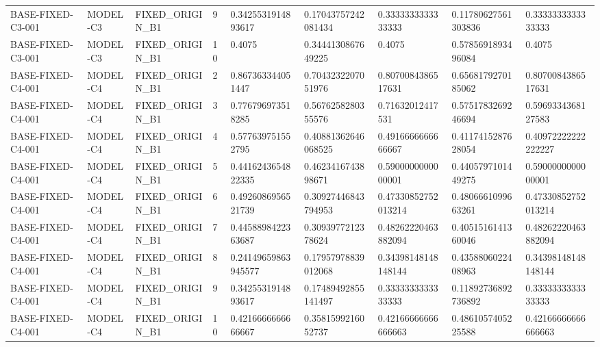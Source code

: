 \begin{tabular}{lllllllll}
BASE-FIXED-C3-001 & MODEL-C3 & FIXED\_ORIGIN\_B1 & 9 & 0.3425531914893617 & 0.17043757242081434 & 0.3333333333333333 & 0.11780627561303836 & 0.3333333333333333 \\
BASE-FIXED-C3-001 & MODEL-C3 & FIXED\_ORIGIN\_B1 & 10 & 0.4075 & 0.3444130867649225 & 0.4075 & 0.5785691893496084 & 0.4075 \\
BASE-FIXED-C4-001 & MODEL-C4 & FIXED\_ORIGIN\_B1 & 2 & 0.867363344051447 & 0.7043232207051976 & 0.8070084386517631 & 0.6568179270185062 & 0.8070084386517631 \\
BASE-FIXED-C4-001 & MODEL-C4 & FIXED\_ORIGIN\_B1 & 3 & 0.776796973518285 & 0.5676258280355576 & 0.71632012417531 & 0.5751783269246694 & 0.5969334368127583 \\
BASE-FIXED-C4-001 & MODEL-C4 & FIXED\_ORIGIN\_B1 & 4 & 0.577639751552795 & 0.40881362646068525 & 0.4916666666666667 & 0.4117415287628054 & 0.40972222222222227 \\
BASE-FIXED-C4-001 & MODEL-C4 & FIXED\_ORIGIN\_B1 & 5 & 0.4416243654822335 & 0.4623416743898671 & 0.5900000000000001 & 0.4405797101449275 & 0.5900000000000001 \\
BASE-FIXED-C4-001 & MODEL-C4 & FIXED\_ORIGIN\_B1 & 6 & 0.4926086956521739 & 0.30927446843794953 & 0.47330852752013214 & 0.4806661099663261 & 0.47330852752013214 \\
BASE-FIXED-C4-001 & MODEL-C4 & FIXED\_ORIGIN\_B1 & 7 & 0.4458898422363687 & 0.3093977212378624 & 0.48262220463882094 & 0.4051516141360046 & 0.48262220463882094 \\
BASE-FIXED-C4-001 & MODEL-C4 & FIXED\_ORIGIN\_B1 & 8 & 0.24149659863945577 & 0.17957978839012068 & 0.34398148148148144 & 0.4358806022408963 & 0.34398148148148144 \\
BASE-FIXED-C4-001 & MODEL-C4 & FIXED\_ORIGIN\_B1 & 9 & 0.3425531914893617 & 0.17489492855141497 & 0.3333333333333333 & 0.11892736892736892 & 0.3333333333333333 \\
BASE-FIXED-C4-001 & MODEL-C4 & FIXED\_ORIGIN\_B1 & 10 & 0.4216666666666667 & 0.3581599216052737 & 0.42166666666666663 & 0.4861057405225588 & 0.42166666666666663 \\
 \hline
\end{tabular}

